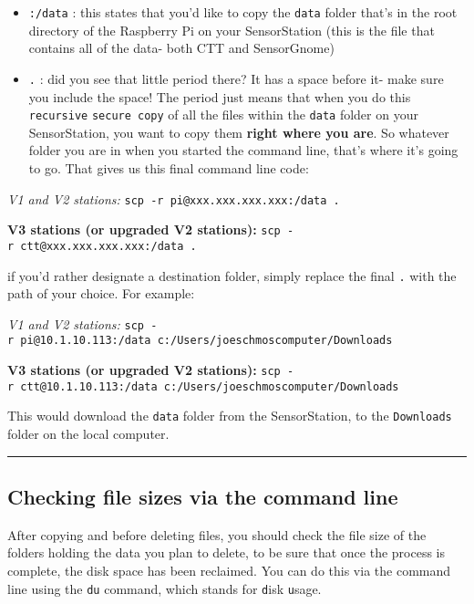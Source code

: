 \documentclass[
]{article}
\providecommand{\tightlist}{%
  \setlength{\itemsep}{0pt}\setlength{\parskip}{0pt}}
\begin{document}
\begin{itemize}
\tightlist
\item
  \texttt{:/data} : this states that you'd like to copy the
  \texttt{data} folder that's in the root directory of the Raspberry Pi
  on your SensorStation (this is the file that contains all of the data-
  both CTT and SensorGnome)
\item
  \texttt{.} : did you see that little period there? It has a space
  before it- make sure you include the space! The period just means that
  when you do this \texttt{recursive} \texttt{secure\ copy} of all the
  files within the \texttt{data} folder on your SensorStation, you want
  to copy them \textbf{right where you are}. So whatever folder you are
  in when you started the command line, that's where it's going to go.
  That gives us this final command line code:
\end{itemize}

\emph{V1 and V2 stations:} \texttt{scp\ -r\ pi@xxx.xxx.xxx.xxx:/data\ .}

\textbf{V3 stations (or upgraded V2 stations):}
\texttt{scp\ -r\ ctt@xxx.xxx.xxx.xxx:/data\ .}

if you'd rather designate a destination folder, simply replace the final
\texttt{.} with the path of your choice. For example:

\emph{V1 and V2 stations:}
\texttt{scp\ -r\ pi@10.1.10.113:/data\ c:/Users/joeschmoscomputer/Downloads}

\textbf{V3 stations (or upgraded V2 stations):}
\texttt{scp\ -r\ ctt@10.1.10.113:/data\ c:/Users/joeschmoscomputer/Downloads}

This would download the \texttt{data} folder from the SensorStation, to
the \texttt{Downloads} folder on the local computer.

\begin{center}\rule{0.5\linewidth}{0.5pt}\end{center}

\hypertarget{checking-file-sizes-via-the-command-line}{%
\subsection{Checking file sizes via the command
line}\label{checking-file-sizes-via-the-command-line}}

After copying and before deleting files, you should check the file size
of the folders holding the data you plan to delete, to be sure that once
the process is complete, the disk space has been reclaimed. You can do
this via the command line using the \texttt{du} command, which stands
for \texttt{d}isk \texttt{u}sage.
\end{document}
